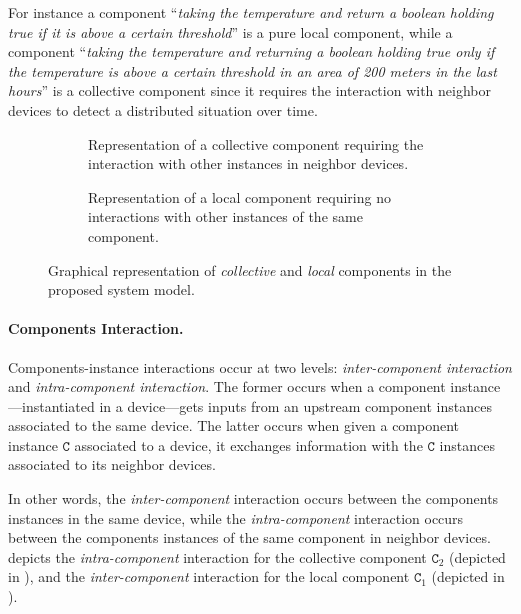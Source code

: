 For instance a component ``\emph{taking the temperature and return a boolean holding true if it is above a certain threshold}'' 
 is a pure local component, while a component ``\emph{taking the temperature and returning a boolean holding true only 
 if the temperature is above a certain threshold in an area of 200 meters in the last hours}''
 is a collective component since it requires the interaction with neighbor devices to detect a distributed situation over time. 

\begin{figure}
  \centering

  \begin{subfigure}[t]{0.45\textwidth}
    \centering
    \resizebox{\linewidth}{!}{%
    }
    \caption{
      Representation of a collective component requiring the interaction
      with other instances in neighbor devices.
    }
    \label{fig:collective-component}
  \end{subfigure}
  \hfill
  \begin{subfigure}[t]{0.45\textwidth}
    \centering
    \resizebox{\linewidth}{!}{%
    }
    \caption{
      Representation of a local component requiring no interactions
      with other instances of the same component.
    }
    \label{fig:local-component}
  \end{subfigure}

  \caption{
    Graphical representation of \emph{collective} and \emph{local}
    components in the proposed system model.
  }
  \label{fig:collective-local-components}
\end{figure}

\paragraph{Components Interaction.}
Components-instance interactions occur at two levels:
 \emph{inter-component interaction} and \emph{intra-component interaction}.
%
The former occurs when a component instance---instantiated in a device---gets inputs 
 from an upstream component instances associated to the same device.
%
The latter occurs when given a component instance $\mathtt{C}$ associated to a device,
 it exchanges information with the $\mathtt{C}$ instances associated to its neighbor devices.

In other words,
 the \emph{inter-component} interaction occurs between the components instances in the same device,
 while the \emph{intra-component} interaction occurs between the components instances of the same component in neighbor devices.
%
 depicts the \emph{intra-component} interaction 
 for the collective component $\mathtt{C}_2$ (depicted in ),
 and the \emph{inter-component} interaction for the local component $\texttt{C}_1$ (depicted in ).

